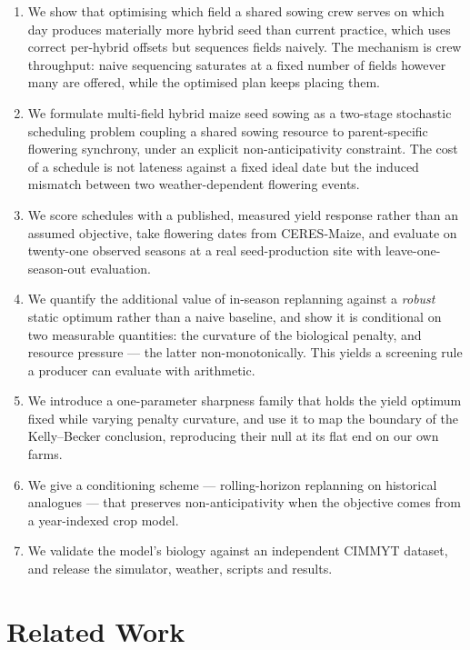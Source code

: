 \documentclass[10pt,twocolumn]{article}
\begin{document}
\begin{enumerate}
\itemsep1pt
\item We show that optimising which field a shared sowing crew serves on
which day produces materially more hybrid seed than current practice, which
uses correct per-hybrid offsets but sequences fields naively. The mechanism
is crew throughput: naive sequencing saturates at a fixed number of fields
however many are offered, while the optimised plan keeps placing them.
\item We formulate multi-field hybrid maize seed sowing as a two-stage
stochastic scheduling problem coupling a shared sowing resource to
parent-specific flowering synchrony, under an explicit non-anticipativity
constraint. The cost of a schedule is not lateness against a fixed ideal date
but the induced mismatch between two weather-dependent flowering events.
\item We score schedules with a published, measured yield response rather
than an assumed objective, take flowering dates from CERES-Maize, and
evaluate on twenty-one observed seasons at a real seed-production site with
leave-one-season-out evaluation.
\item We quantify the additional value of in-season replanning against a
\emph{robust} static optimum rather than a naive baseline, and show it is
conditional on two measurable quantities: the curvature of the biological
penalty, and resource pressure --- the latter non-monotonically. This yields
a screening rule a producer can evaluate with arithmetic.
\item We introduce a one-parameter sharpness family that holds the yield
optimum fixed while varying penalty curvature, and use it to map the
boundary of the Kelly--Becker conclusion, reproducing their null at its flat
end on our own farms.
\item We give a conditioning scheme --- rolling-horizon replanning on
historical analogues --- that preserves non-anticipativity when the objective
comes from a year-indexed crop model.
\item We validate the model's biology against an independent CIMMYT dataset,
and release the simulator, weather, scripts and results.
\end{enumerate}

\section{Related Work}
\end{document}

